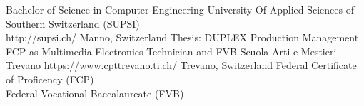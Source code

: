 \begin{CV}
    {Bachelor of Science in Computer Engineering}
    {\small University Of Applied Sciences of Southern Switzerland (SUPSI)\\}
    {http://supsi.ch/}
    {Manno, Switzerland}
    {Thesis: DUPLEX Production Management}
    {FCP as Multimedia Electronics Technician and FVB}
    {Scuola Arti e Mestieri Trevano}
    {https://www.cpttrevano.ti.ch/}
    {Trevano, Switzerland}
    {Federal Certificate of Proficency (FCP)\\Federal Vocational Baccalaureate (FVB)}
\end{CV}
